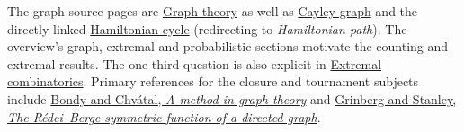 The graph source pages are \href{https://en.wikipedia.org/wiki/Graph_theory}{Graph theory} as well as \href{https://en.wikipedia.org/wiki/Cayley_graph}{Cayley graph} and the directly linked \href{https://en.wikipedia.org/wiki/Hamiltonian_cycle}{Hamiltonian cycle} (redirecting to \emph{Hamiltonian path}). The overview's graph, extremal and probabilistic sections motivate the counting and extremal results. The one-third question is also explicit in \href{https://en.wikipedia.org/wiki/Extremal_combinatorics}{Extremal combinatorics}. Primary references for the closure and tournament subjects include \href{https://doi.org/10.1016/0012-365X(76)90078-9}{Bondy and Chv\'atal, \emph{A method in graph theory}} and \href{https://arxiv.org/abs/2307.05569}{Grinberg and Stanley, \emph{The R\'edei--Berge symmetric function of a directed graph}}.
